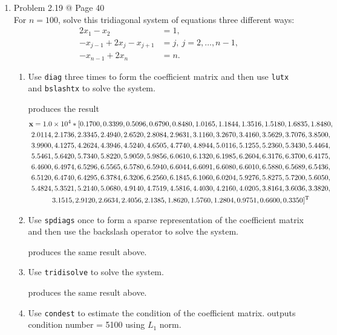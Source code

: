 \documentclass[10pt]{report}
\begin{document}
\begin{enumerate}
	\item 
	Problem 2.19 @ Page 40\\
	For $n = 100$, solve this tridiagonal system of equations three different ways:
	\begin{align*}
	2x_1 - x_2 &= 1,\\
	-x_{j-1} + 2x_j - x_{j+1} &= j,\ j = 2, \dots, n-1,\\
	-x_{n-1} + 2x_n &= n.
	\end{align*}
	\begin{enumerate}
		\item 
		Use \verb|diag| three times to form the coefficient matrix and then use \verb|lutx| and \verb|bslashtx| to solve the system.
		
		produces the result
		\begin{multline*}
			\mathbf{x} = \num{1.0e+04} * [0.1700,0.3399,0.5096,0.6790,0.8480,1.0165,1.1844,1.3516,1.5180,1.6835,1.8480,\\
			2.0114,2.1736,2.3345,2.4940,2.6520,2.8084,2.9631,3.1160,3.2670,3.4160,3.5629,3.7076,3.8500,\\
			3.9900,4.1275,4.2624,4.3946,4.5240,4.6505,4.7740,4.8944,5.0116,5.1255,5.2360,5.3430,5.4464,\\
			5.5461,5.6420,5.7340,5.8220,5.9059,5.9856,6.0610,6.1320,6.1985,6.2604,6.3176,6.3700,6.4175,\\
			6.4600,6.4974,6.5296,6.5565,6.5780,6.5940,6.6044,6.6091,6.6080,6.6010,6.5880,6.5689,6.5436,\\
			6.5120,6.4740,6.4295,6.3784,6.3206,6.2560,6.1845,6.1060,6.0204,5.9276,5.8275,5.7200,5.6050,\\
			5.4824,5.3521,5.2140,5.0680,4.9140,4.7519,4.5816,4.4030,4.2160,4.0205,3.8164,3.6036,3.3820,\\
			3.1515,2.9120,2.6634,2.4056,2.1385,1.8620,1.5760,1.2804,0.9751,0.6600,0.3350]^{\rm T}
		\end{multline*}
		
		\item 
		Use \verb|spdiags| once to form a sparse representation of the coefficient matrix and then use the backslash operator to solve the system.
		
		produces the same result above.
		
		\item 
		Use \verb|tridisolve| to solve the system.
		
		produces the same result above.
		
		\item 
		Use \verb|condest| to estimate the condition of the coefficient matrix.
		outputs condition number = 5100 using $L_1$ norm.
	\end{enumerate}
	
\end{enumerate}
\end{document}

